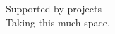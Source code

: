 \documentclass[sigconf]{acmart}
\begin{document}








\begin{acks}
  Supported by projects\\
  Taking this much space.
\end{acks}

%

 
\end{document}
